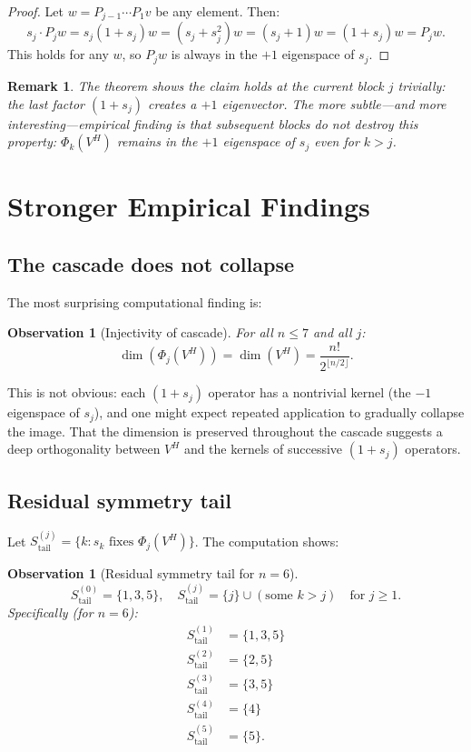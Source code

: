 \documentclass[12pt]{article}
\newtheorem{observation}[theorem]{Observation}
\newtheorem{remark}[theorem]{Remark}
\theoremstyle{definition}
\begin{document}
\begin{proof}
  Let $w = P_{j-1} \cdots P_1 v$ be any element. Then:
  \[
    s_j \cdot P_j w = s_j (1 + s_j) w = (s_j + s_j^2) w = (s_j + 1) w = (1 + s_j) w = P_j w.
  \]
  This holds for any $w$, so $P_j w$ is always in the $+1$ eigenspace of $s_j$.
\end{proof}

\begin{remark}
  The theorem shows the claim holds at the \emph{current} block $j$ trivially: the last factor $(1+s_j)$ creates a $+1$ eigenvector. The more subtle---and more interesting---empirical finding is that \emph{subsequent} blocks do not destroy this property: $\Phi_k(V^H)$ remains in the $+1$ eigenspace of $s_j$ even for $k > j$.
\end{remark}

\section{Stronger Empirical Findings}

\subsection{The cascade does not collapse}

The most surprising computational finding is:

\begin{observation}[Injectivity of cascade]
  For all $n \le 7$ and all $j$:
  \[
    \dim(\Phi_j(V^H)) = \dim(V^H) = \frac{n!}{2^{\lfloor n/2 \rfloor}}.
  \]
\end{observation}

This is not obvious: each $(1+s_j)$ operator has a nontrivial kernel (the $-1$ eigenspace of $s_j$), and one might expect repeated application to gradually collapse the image. That the dimension is preserved throughout the cascade suggests a deep orthogonality between $V^H$ and the kernels of successive $(1+s_j)$ operators.

\subsection{Residual symmetry tail}

Let $S_{\text{tail}}^{(j)} = \{k : s_k \text{ fixes } \Phi_j(V^H)\}$. The computation shows:

\begin{observation}[Residual symmetry tail for $n=6$]
  \[
    S_{\text{tail}}^{(0)} = \{1, 3, 5\}, \quad S_{\text{tail}}^{(j)} = \{j\} \cup (\text{some } k > j) \quad \text{for } j \ge 1.
  \]
  Specifically (for $n=6$):
  \begin{align*}
    S_{\text{tail}}^{(1)} &= \{1, 3, 5\} \\
    S_{\text{tail}}^{(2)} &= \{2, 5\} \\
    S_{\text{tail}}^{(3)} &= \{3, 5\} \\
    S_{\text{tail}}^{(4)} &= \{4\} \\
    S_{\text{tail}}^{(5)} &= \{5\}.
  \end{align*}
\end{observation}
\end{document}
